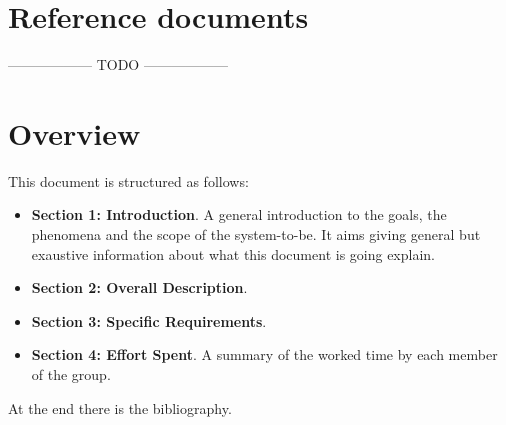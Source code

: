 \section{Reference documents}
------------------ TODO ------------------

\section{Overview}
This document is structured as follows:
\begin{itemize}
  \setlength{\itemindent}{-.4in}
  \item[] \textbf{Section 1: Introduction}. A general introduction to the goals, the phenomena and the scope of the system-to-be. It aims giving general but exaustive information about what this document is going explain.
  \item[] \textbf{Section 2: Overall Description}.
  \item[] \textbf{Section 3: Specific Requirements}.
  \item[] \textbf{Section 4: Effort Spent}. A summary of the worked time by each member of the group.
\end{itemize}
At the end there is the bibliography.

